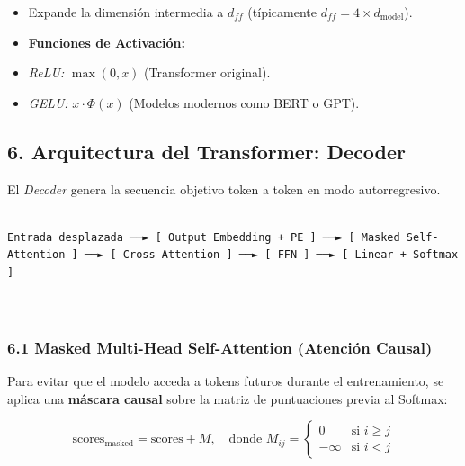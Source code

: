 \documentclass[11pt,oneside]{article}
\begin{document}
\begin{itemize}

\item Expande la dimensión intermedia a \(d_{ff}\) (típicamente \(d_{ff} = 4 \times d_{\text{model}}\)).

\end{itemize}

\begin{itemize}

\item \textbf{Funciones de Activación:}

\item \emph{ReLU:} \(\max(0, x)\) (Transformer original).

\end{itemize}

\begin{itemize}

\item \emph{GELU:} \(x \cdot \Phi(x)\) (Modelos modernos como BERT o GPT).

\end{itemize}

\subsection{6. Arquitectura del Transformer: Decoder}

El \emph{Decoder} genera la secuencia objetivo token a token en modo autorregresivo.

\begin{lstlisting}

Entrada desplazada ──► [ Output Embedding + PE ] ──► [ Masked Self-Attention ] ──► [ Cross-Attention ] ──► [ FFN ] ──► [ Linear + Softmax ]



\end{lstlisting}

\subsubsection{6.1 Masked Multi-Head Self-Attention (Atención Causal)}

Para evitar que el modelo acceda a tokens futuros durante el entrenamiento, se aplica una \textbf{máscara causal} sobre la matriz de puntuaciones previa al Softmax:

\[\text{scores}_{\text{masked}} = \text{scores} + M, \quad \text{donde } M_{ij} = \begin{cases} 0 & \text{si } i \ge j \\ -\infty & \text{si } i < j \end{cases}\]
\end{document}
